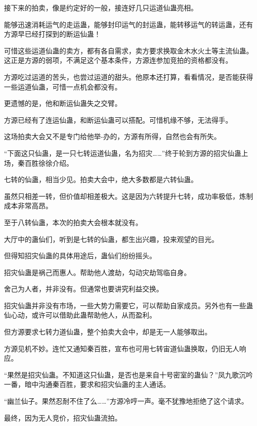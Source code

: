
\begin{this_body}

接下来的拍卖，像是约定好的一般，接连好几只运道仙蛊亮相。

能够迅速消耗运气的走运蛊，能够封印运气的封运蛊，能转移运气的转运蛊，还有方源早已经打探到的断运仙蛊！

可惜这些运道仙蛊的卖方，都有各自需求，卖方要求换取金木水火土等主流仙蛊。这正是方源的弱项，不满足这个基本条件，方源连参加竞拍的资格都没有。

方源吃过运道的苦头，也尝过运道的甜头。他原本还打算，看看情况，是否能获得一些运道仙蛊，可惜一点机会都没有。

更遗憾的是，他和断运仙蛊失之交臂。

方源已经有了连运仙蛊，和断运仙蛊可以搭配。可惜机缘不够，无法得手。

这场拍卖大会又不是专门给他举-办的，方源有所得，自然也会有所失。

“下面这只仙蛊，是一只七转运道仙蛊，名为招灾……”终于轮到方源的招灾仙蛊上场，秦百胜徐徐介绍。

七转的仙蛊，相当少见。拍卖大会中，绝大多数都是六转仙蛊。

虽然只相差一转，但价值却相差极大。这是因为六转提升七转，成功率极低，炼制成本非常高昂。

至于八转仙蛊，本次的拍卖大会根本就没有。

大厅中的蛊仙们，听到是七转的仙蛊，都生出兴趣，投来观望的目光。

但得知招灾仙蛊的具体用途后，蛊仙们纷纷摇头。

招灾仙蛊是祸己而惠人。帮助他人渡劫，勾动灾劫驾临自身。

舍己为人者，并非没有。但通常也要讲究利益交换。

招灾仙蛊并非没有市场，一些大势力需要它，可以帮助自家成员。另外也有一些蛊仙心动，或许可以借助此蛊帮助他人，从而盈利。

但方源要求七转力道仙蛊，整个拍卖大会中，却是无一人能够取出。

方源见机不妙。连忙又通知秦百胜，宣布也可用七转宙道仙蛊换取，仍旧无人响应。

“果然是招灾仙蛊。不知道这只仙蛊，是否也是来自十号密室的蛊仙？”凤九歌沉吟一番，暗中沟通秦百胜，要求和招灾仙蛊的主人通话。

“幽兰仙子。果然忍耐不住了么……”方源冷哼一声。毫不犹豫地拒绝了这个请求。

最终，因为无人竞价，招灾仙蛊流拍。


\end{this_body}
